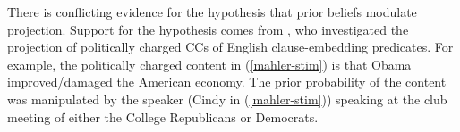 \documentclass[OpenMind]{stjour}
\begin{document}




%


There is conflicting evidence for the hypothesis that prior beliefs modulate projection. Support for the hypothesis comes from \citet{mahler2020}, who investigated the projection of politically charged CCs of 
English clause-embedding predicates. For example, the politically charged content in (\ref{mahler-stim}) is that Obama improved/damaged the American economy. The prior probability of the content was manipulated by the speaker (Cindy in (\ref{mahler-stim})) speaking at the club meeting of either the College Republicans or Democrats.
\end{document}
